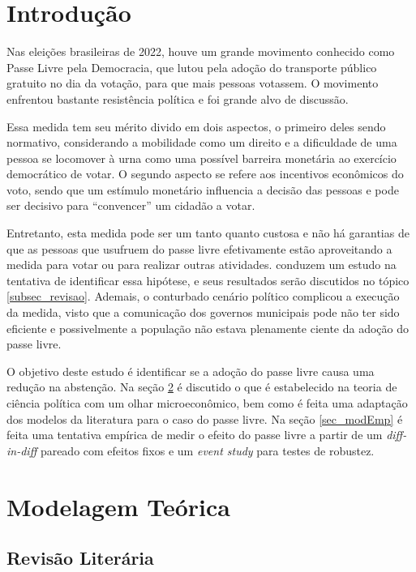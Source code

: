 \section{Introdução}

Nas eleições brasileiras de 2022, houve um grande movimento conhecido como Passe Livre pela Democracia, que lutou pela adoção do transporte público gratuito no dia da votação, para que mais pessoas votassem. O movimento enfrentou bastante resistência política e foi grande alvo de discussão. 

Essa medida tem seu mérito divido em dois aspectos, o primeiro deles sendo normativo, considerando a mobilidade como um direito e a dificuldade de uma pessoa se locomover à urna como uma possível barreira monetária ao exercício democrático de votar. O segundo aspecto se refere aos incentivos econômicos do voto, sendo que um estímulo monetário influencia a decisão das pessoas e pode ser decisivo para ``convencer'' um cidadão a votar.

Entretanto, esta medida pode ser um tanto quanto custosa e não há garantias de que as pessoas que usufruem do passe livre efetivamente estão aproveitando a medida para votar ou para realizar outras atividades. \textcite{pereira2023transporte} conduzem um estudo na tentativa de identificar essa hipótese, e seus resultados serão discutidos no tópico \ref{subsec_revisao}. Ademais, o conturbado cenário político complicou a execução da medida, visto que a comunicação dos governos municipais pode não ter sido eficiente e possivelmente a população não estava plenamente ciente da adoção do passe livre. 

O objetivo deste estudo é identificar se a adoção do passe livre causa uma redução na abstenção. Na seção \ref{sec_teor} é discutido o que é estabelecido na teoria de ciência política com um olhar microeconômico, bem como é feita uma adaptação dos modelos da literatura para o caso do passe livre. Na seção \ref{sec_modEmp} é feita uma tentativa empírica de medir o efeito do passe livre a partir de um \textit{diff-in-diff} pareado com efeitos fixos e um \textit{event study} para testes de robustez.

\section{Modelagem Teórica}
\label{sec_teor}

\subsection{Revisão Literária}
\label{subsec_revisLit}

